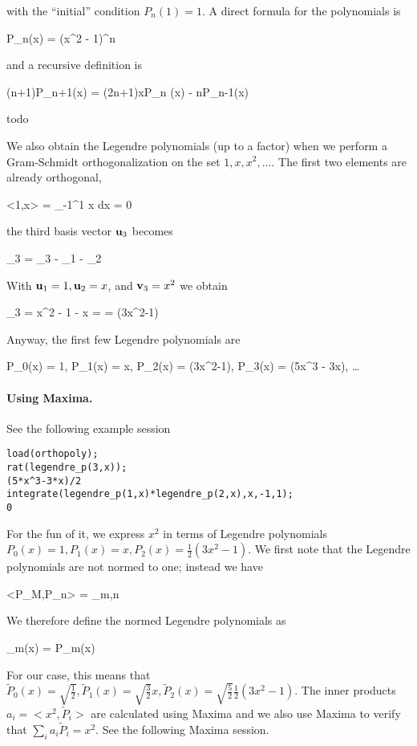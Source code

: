 with the ``initial'' condition $P_n(1) = 1$. A direct formula for the polynomials is

\bee
P_n(x) = (x^2 - 1)^n
\eee

and a recursive definition is

\bee
(n+1)P_{n+1}(x) = (2n+1)xP_n (x) - nP_{n-1}(x)
\eee

todo

We also obtain the Legendre polynomials (up to a factor) when we perform a Gram-Schmidt orthogonalization on the set $1,x,x^2, \ldots$. The first two elements are already orthogonal,

\bee
<1,x> = \int_{-1}^1 x dx = 0
\eee

the third basis vector $\mathbf{u}_3$ becomes

\bee
\ubf_3 = \vbf_3 -  \ubf_1 -  \ubf_2
\eee

With $\mathbf{u}_1 = 1, \mathbf{u}_2 = x$, and $\mathbf{v}_3 = x^2$ we obtain

\bee
\ubf_3 = x^2 - 1 - x = \cdots = (3x^2-1)
\eee

Anyway, the first few Legendre polynomials are

\bee
P_0(x) = 1, P_1(x) = x, P_2(x) = (3x^2-1), P_3(x) = (5x^3 - 3x), \ldots
\eee

\paragraph{Using Maxima.} See the following example session

\begin{verbatim}
load(orthopoly);
rat(legendre_p(3,x));
(5*x^3-3*x)/2
integrate(legendre_p(1,x)*legendre_p(2,x),x,-1,1);
0
\end{verbatim}

For the fun of it, we express $x^2$ in terms of Legendre polynomials $P_0(x) = 1, P_1(x) = x, P_2(x) = \frac{1}{2}(3x^2-1)$. We first note that the Legendre polynomials are not normed to one; instead we have

\bee
<P_M,P_n> =  \delta_{m,n}
\eee

We therefore define the normed Legendre polynomials as

\bee
{}_m(x) =  P_m(x)
\eee

For our case, this means that $\tilde{P}_0(x) = \sqrt{\frac{1}{2}}, \tilde{P}_1(x) = \sqrt{\frac{3}{2}}x, \tilde{P}_2(x) = \sqrt{\frac{5}{2}}\frac{1}{2}(3x^2-1)$. The inner products $a_i = <x^2, \tilde{P}_i>$ are calculated using Maxima and we also use Maxima to verify that $\sum_i a_i \tilde{P}_i = x^2$. See the following Maxima session.

